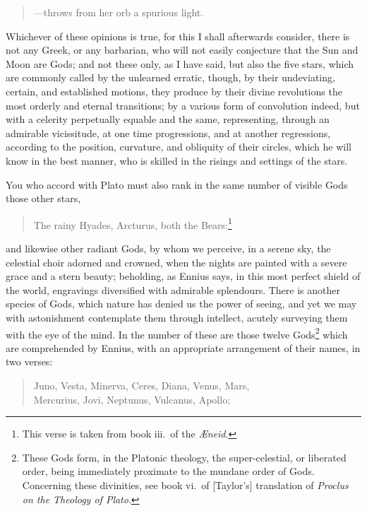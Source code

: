 \documentclass{article}
\begin{document}
\begin{verse}
---throws from her orb a spurious light. 
\end{verse}

\noindent Whichever of these opinions is true, for this I shall afterwards
consider, there is not any Greek, or any barbarian, who will not easily
conjecture that the Sun and Moon are Gods; and not these only, as I have said,
but also the five stars, which are commonly called by the unlearned erratic,
though, by their undeviating, certain, and established motions, they produce by
their divine revolutions the most orderly and eternal transitions; by a various
form of convolution indeed, but with a celerity perpetually equable and the
same, representing, through an admirable vicissitude, at one time progressions,
and at another regressions, according to the position, curvature, and obliquity
of their circles, which he will know in the best manner, who is skilled in the
risings and settings of the stars.

You who accord with Plato must also rank in the same number of visible Gods
those other stars,

\begin{verse}
The rainy Hyades, Arcturus, both the Bears:\footnote{This verse is taken from
book iii.~of the \textit{{\AE}neid}.}
\end{verse}

\noindent and likewise other radiant Gods, by whom we perceive, in a serene
sky, the celestial choir adorned and crowned, when the nights are painted with
a severe grace and a stern beauty; beholding, as Ennius says, in this most
perfect shield of the world, engravings diversified with admirable splendours.
There is another species of Gods, which nature has denied us the power of
seeing, and yet we may with astonishment contemplate them through intellect,
acutely surveying them with the eye of the mind. In the number of these are
those twelve Gods\footnote{These Gods form, in the Platonic theology, the
super-celestial, or liberated order, being immediately proximate to the mundane
order of Gods. Concerning these divinities, see book vi.~of [Taylor's]
translation of \textit{Proclus on the Theology of Plato}.} which are
comprehended by Ennius, with an appropriate arrangement of their names, in two
verses:

\begin{verse}
Juno, Vesta, Minerva, Ceres, Diana, Venus, Mars,\\
Mercurius, Jovi, Neptunus, Vulcanus, Apollo;
\end{verse}
\end{document}
